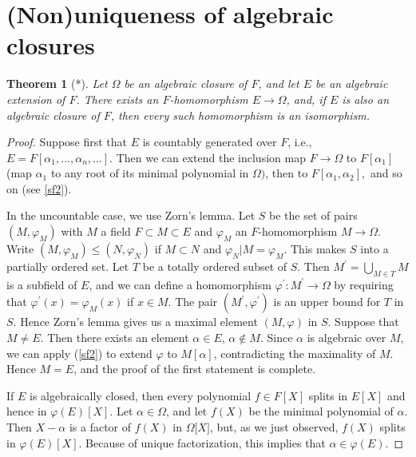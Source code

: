 \documentclass[a4paper,11pt,final,openany]{memoir}
\newtheorem{theorem}[X]{Theorem}
\theoremstyle{nonumberplain}
\newtheorem{proof}{Proof.}
\begin{document}
\section{(Non)uniqueness of algebraic closures}

\begin{theorem}
[*]\label{sf16}Let $\Omega$ be an algebraic closure of $F$, and let $E$ be an
algebraic extension of $F$. There exists an $F$-homomorphism $E\rightarrow
\Omega$, and, if $E$ is also an algebraic closure of $F$, then every such
homomorphism is an isomorphism.
\end{theorem}

\begin{proof}
Suppose first that $E$ is countably generated over $F$, i.e., $E=F[\alpha
_{1},...,\alpha_{n},\ldots]$. Then we can extend the inclusion map
$F\rightarrow\Omega$ to $F[\alpha_{1}]$ (map $\alpha_{1}$ to any root of its
minimal polynomial in $\Omega)$, then to $F[\alpha_{1},\alpha_{2}],$ and so on
(see \ref{sf2}).

In the uncountable case, we use Zorn's lemma. Let $S$ be the set of pairs
$(M,\varphi_{M})$ with $M$ a field $F\subset M\subset E$ and $\varphi_{M}$ an
$F$-homomorphism $M\rightarrow\Omega$. Write $(M,\varphi_{M})\leq
(N,\varphi_{N})$ if $M\subset N$ and $\varphi_{N}|M=\varphi_{M}$. This makes
$S$ into a partially ordered set. Let $T$ be a totally ordered subset of $S$.
Then $M^{\prime}=\bigcup_{M\in T}M$ is a subfield of $E$, and we can define a
homomorphism $\varphi^{\prime}\colon M^{\prime}\rightarrow\Omega$ by requiring
that $\varphi^{\prime}(x)=\varphi_{M}(x)$ if $x\in M$. The pair $(M^{\prime
},\varphi^{\prime})$ is an upper bound for $T$ in $S$. Hence Zorn's lemma
gives us a maximal element $(M,\varphi)$ in $S$. Suppose that $M\neq E$. Then
there exists an element $\alpha\in E$, $\alpha\notin M$. Since $\alpha$ is
algebraic over $M$, we can apply (\ref{sf2}) to extend $\varphi$ to
$M[\alpha]$, contradicting the maximality of $M$. Hence $M=E$, and the proof
of the first statement is complete.

If $E$ is algebraically closed, then every polynomial $f\in F[X]$ splits in
$E[X]$ and hence in $\varphi(E)[X]$. Let $\alpha\in\Omega$, and let $f(X)$ be
the minimal polynomial of $\alpha$. Then $X-\alpha$ is a factor of $f(X) $ in
$\Omega\lbrack X]$, but, as we just observed, $f(X)$ splits in $\varphi
(E)[X]$. Because of unique factorization, this implies that $\alpha\in
\varphi(E)$.
\end{proof}
\end{document}
